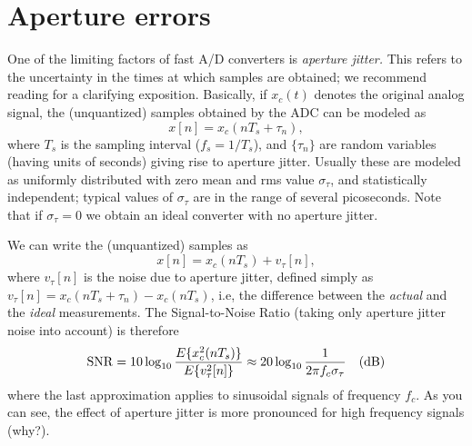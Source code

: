 \documentclass[11pt]{article}
\begin{document}
\section{Aperture errors}
One of the limiting factors of fast A/D converters is {\em aperture jitter.} This refers to the uncertainty 
in the times at which samples are obtained; we recommend reading \cite{K7} for a clarifying exposition.
Basically, if $x_c(t)$ denotes the original analog signal, the (unquantized) samples obtained by the ADC can be modeled as
\[ x[n] = x_c(nT_s + \tau_n), \]
where $T_s$ is the sampling interval ($f_s=1/T_s$), and $\{\tau_n\}$ are random variables (having units of seconds) giving rise to aperture jitter.
Usually these are modeled as uniformly distributed with zero mean and rms value $\sigma_\tau$, and statistically independent; typical values of $\sigma_\tau$ are in the range of several picoseconds. Note that if $\sigma_\tau = 0$ we obtain an ideal converter with no aperture jitter.

We can write the (unquantized) samples as
\[ x[n] = x_c(nT_s) + v_\tau[n], \]
where $v_\tau[n]$ is the noise due to aperture jitter, defined simply as $v_\tau[n] = x_c(nT_s + \tau_n) - x_c(nT_s)$, i.e, the difference between the {\em actual} and the {\em ideal} measurements.
The Signal-to-Noise Ratio (taking only aperture jitter noise into account) is therefore
\[ {\rm SNR} = 10 \log_{10} \frac{E\{x_c^2(nT_s)\}}{ E\{ v_\tau^2[n] \}} \approx 20 \log_{10} \frac{1}{2\pi f_c \sigma_\tau} \quad \text{(dB)} 
\]
where the last approximation applies to sinusoidal signals of frequency $f_c$. As you can see,
the effect of aperture jitter is more pronounced for high frequency signals (why?). 
\end{document}
